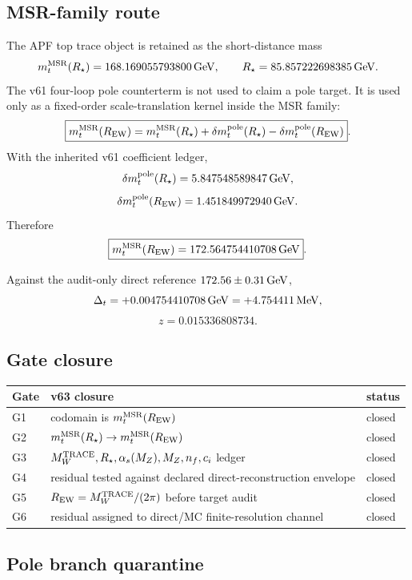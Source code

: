 \subsection{MSR-family route}

The APF top trace object is retained as the short-distance mass
\[
m_t^{\rm MSR}(R_\star)=168.169055793800\,{\rm GeV},
\qquad
R_\star=85.857222698385\,{\rm GeV}.
\]
The v61 four-loop pole counterterm is not used to claim a pole target. It is used only as a fixed-order scale-translation kernel inside the MSR family:
\[
\boxed{
m_t^{\rm MSR}(R_{\rm EW})
=
m_t^{\rm MSR}(R_\star)
+
\delta m_t^{\rm pole}(R_\star)
-
\delta m_t^{\rm pole}(R_{\rm EW})
}.
\]
With the inherited v61 coefficient ledger,
\[
\delta m_t^{\rm pole}(R_\star)=5.847548589847\,{\rm GeV},
\]
\[
\delta m_t^{\rm pole}(R_{\rm EW})=1.451849972940\,{\rm GeV}.
\]
Therefore
\[
\boxed{m_t^{\rm MSR}(R_{\rm EW})=172.564754410708\,{\rm GeV}}.
\]

Against the audit-only direct reference $172.56\pm0.31\,{\rm GeV}$,
\[
\Delta_t=+0.004754410708\,{\rm GeV}=+4.754411\,{\rm MeV},
\]
\[
\boxed{z=0.015336808734}.
\]

\subsection{Gate closure}

\begin{center}
\begin{tabular}{lll}
Gate & v63 closure & status \\
\hline
G1 & codomain is $m_t^{\rm MSR}(R_{\rm EW})$ & closed \\
G2 & $m_t^{\rm MSR}(R_\star)\to m_t^{\rm MSR}(R_{\rm EW})$ & closed \\
G3 & $M_W^{\rm TRACE},R_\star,\alpha_s(M_Z),M_Z,n_f,c_i$ ledger & closed \\
G4 & residual tested against declared direct-reconstruction envelope & closed \\
G5 & $R_{\rm EW}=M_W^{\rm TRACE}/(2\pi)$ before target audit & closed \\
G6 & residual assigned to direct/MC finite-resolution channel & closed \\
\end{tabular}
\end{center}

\subsection{Pole branch quarantine}


